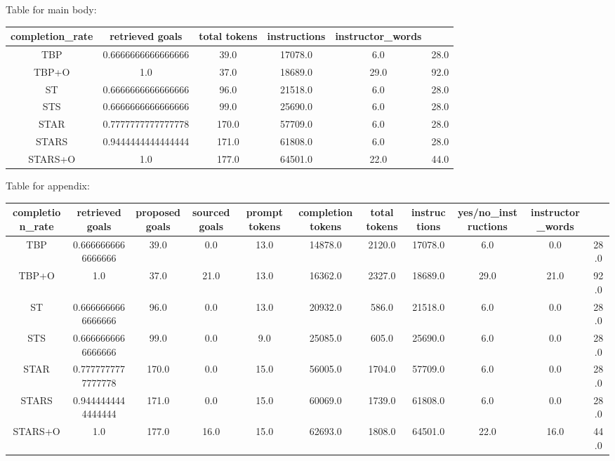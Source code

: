 Table for main body:
\begin{tabular}{c ccccc|}
\hline
completion_rate & retrieved goals & total tokens & instructions & instructor_words \\
\hline
TBP & 0.6666666666666666 & 39.0 & 17078.0 & 6.0 & 28.0 \\
TBP+O & 1.0 & 37.0 & 18689.0 & 29.0 & 92.0 \\
ST & 0.6666666666666666 & 96.0 & 21518.0 & 6.0 & 28.0 \\
STS & 0.6666666666666666 & 99.0 & 25690.0 & 6.0 & 28.0 \\
STAR & 0.7777777777777778 & 170.0 & 57709.0 & 6.0 & 28.0 \\
STARS & 0.9444444444444444 & 171.0 & 61808.0 & 6.0 & 28.0 \\
STARS+O & 1.0 & 177.0 & 64501.0 & 22.0 & 44.0 \\
\hline
\end{tabular}

Table for appendix:
\begin{tabular}{c cccccccccc|}
\hline
completion_rate & retrieved goals & proposed goals & sourced goals & prompt tokens & completion tokens & total tokens & instructions & yes/no_instructions & instructor_words \\
\hline
TBP & 0.6666666666666666 & 39.0 & 0.0 & 13.0 & 14878.0 & 2120.0 & 17078.0 & 6.0 & 0.0 & 28.0 \\
TBP+O & 1.0 & 37.0 & 21.0 & 13.0 & 16362.0 & 2327.0 & 18689.0 & 29.0 & 21.0 & 92.0 \\
ST & 0.6666666666666666 & 96.0 & 0.0 & 13.0 & 20932.0 & 586.0 & 21518.0 & 6.0 & 0.0 & 28.0 \\
STS & 0.6666666666666666 & 99.0 & 0.0 & 9.0 & 25085.0 & 605.0 & 25690.0 & 6.0 & 0.0 & 28.0 \\
STAR & 0.7777777777777778 & 170.0 & 0.0 & 15.0 & 56005.0 & 1704.0 & 57709.0 & 6.0 & 0.0 & 28.0 \\
STARS & 0.9444444444444444 & 171.0 & 0.0 & 15.0 & 60069.0 & 1739.0 & 61808.0 & 6.0 & 0.0 & 28.0 \\
STARS+O & 1.0 & 177.0 & 16.0 & 15.0 & 62693.0 & 1808.0 & 64501.0 & 22.0 & 16.0 & 44.0 \\
\hline
\end{tabular}

